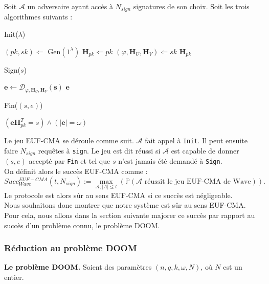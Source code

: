 \documentclass[12pt]{article}
\theoremstyle{plain}
\newcommand{\e}{\mathbf{e}}
\newcommand{\s}{\mathbf{s}}
\begin{document}
Soit $\mathcal{A}$ un adversaire ayant accès à $N_{sign}$ signatures de son choix. Soit les trois algorithmes suivants :


\begin{algorithm} [h]
	\caption{Init($\lambda$)}
	\begin{algorithmic}[1]
    	\STATE $(pk,sk) \Longleftarrow$ Gen$(1^\lambda)$ 
    	\STATE $\mathbf{H}_{pk} \Longleftarrow pk$
    	\STATE $(\varphi,\mathbf{H}_{U},\mathbf{H}_{V})\Longleftarrow sk$
    	\RETURN $\mathbf{H}_{pk}$
    \end{algorithmic}
\end{algorithm}

\begin{algorithm}[h]
	\caption{Sign($s$)}
	\begin{algorithmic}[1]
    	\STATE $\e \leftarrow \mathcal{D}_{\varphi,\mathbf{H}_{U},\mathbf{H}_{V}}(\s)$
    	\RETURN $\e$
    \end{algorithmic}
\end{algorithm}

\begin{algorithm}[h]
	\caption{Fin($(s,e)$)}
	\begin{algorithmic}[1]
    	\RETURN $(\mathbf{e}\mathbf{H}_{pk}^T = s) \land (|\mathbf{e}| = \omega)$
    \end{algorithmic}
\end{algorithm}

\noindent Le jeu EUF-CMA se déroule comme suit. $\mathcal{A}$ fait appel à \verb|Init|. Il peut ensuite faire $N_{sign}$ requêtes à \verb|sign|. Le jeu est dit réussi si $\mathcal{A}$ est capable de donner $(s,e)$ accepté par \verb|Fin| et tel que $s$ n'est jamais été demandé à \verb|Sign|. \\
On définit alors le succès EUF-CMA comme :
$$Succ^{EUF-CMA}_{Wave}(t,N_{sign}) := \max_{\mathcal{A};|A|\leq t}(\mathbb{P}(\mathcal{A}\text{ réussit le jeu EUF-CMA de Wave})).$$
Le protocole est alors sûr au sens EUF-CMA si ce succès est négligeable. \\

\noindent Nous souhaitons donc montrer que notre système est sûr au sens EUF-CMA. Pour cela, nous allons dans la section suivante majorer ce succès par rapport au succès d'un problème connu, le problème DOOM.


\subsubsection{Réduction au problème DOOM}
\textbf{Le problème DOOM.} Soient des paramètres $(n,q,k,\omega,N)$, où $N$ est un entier. \\
\end{document}
